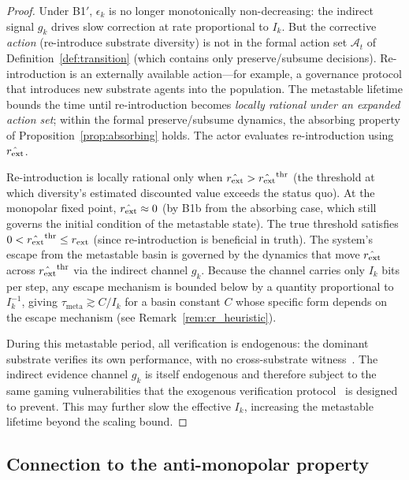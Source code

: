 \begin{proof}
Under B1$'$, $\epsilon_k$ is no longer monotonically non-decreasing:
the indirect signal $g_k$ drives slow correction at rate proportional
to $I_k$.  But the corrective \emph{action} (re-introduce substrate
diversity) is not in the formal action set $\mathcal{A}_t$ of
Definition~\ref{def:transition} (which contains only preserve/subsume
decisions).  Re-introduction is an externally available action---for
example, a governance protocol that introduces new substrate agents
into the population.  The metastable lifetime bounds the time until
re-introduction becomes \emph{locally rational under an expanded
action set}; within the formal preserve/subsume dynamics, the
absorbing property of Proposition~\ref{prop:absorbing} holds.  The
actor evaluates re-introduction using $\hat{r_{\mathrm{ext}}}$.

Re-introduction is locally rational only when
$\hat{r_{\mathrm{ext}}} > \hat{r_{\mathrm{ext}}}^{\mathrm{thr}}$ (the threshold at which
diversity's estimated discounted value exceeds the status quo).
At the monopolar fixed point, $\hat{r_{\mathrm{ext}}} \approx 0$ (by B1b from
the absorbing case, which still governs the initial condition of the
metastable state).  The true threshold satisfies
$0 < \hat{r_{\mathrm{ext}}}^{\mathrm{thr}} \leq r_{\mathrm{ext}}$ (since
re-introduction is beneficial in truth).  The system's escape from
the metastable basin is governed by the dynamics that move
$\hat{r_{\mathrm{ext}}}$ across $\hat{r_{\mathrm{ext}}}^{\mathrm{thr}}$ via the indirect
channel $g_k$.  Because the channel carries only $I_k$ bits per step,
any escape mechanism is bounded below by a quantity proportional to
$I_k^{-1}$, giving $\tau_{\mathrm{meta}} \gtrsim C/I_k$ for a basin
constant $C$ whose specific form depends on the escape mechanism (see
Remark~\ref{rem:cr_heuristic}).

During this metastable period, all verification is endogenous: the
dominant substrate verifies its own performance, with no
cross-substrate witness~\citep[Theorem~1]{lasser2026exo}.  The
indirect evidence channel $g_k$ is itself endogenous and therefore
subject to the same gaming vulnerabilities that the exogenous
verification protocol~\citep{lasser2026exo} is designed to prevent.
This may further slow the effective $I_k$, increasing the metastable
lifetime beyond the scaling bound.
\end{proof}

\subsection{Connection to the anti-monopolar property}

